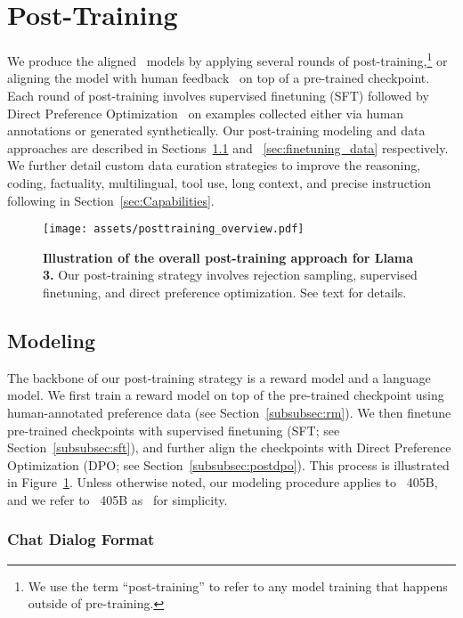 \section{Post-Training}
\label{section:finetuning}
We produce the aligned \llamathree~models by applying several rounds of post-training,\footnote{We use the term ``post-training'' to refer to any model training that happens outside of pre-training.} or aligning the model with human feedback~\citep{ouyang2022instructgpt,rafailov2024direct} on top of a pre-trained checkpoint. Each round of post-training involves supervised finetuning (SFT) followed by Direct Preference Optimization~\citep[DPO;][]{rafailov2024direct} on examples collected either via human annotations or generated synthetically. Our post-training modeling and data approaches are described in Sections~\ref{sec:finetuning_modeling} and ~\ref{sec:finetuning_data} respectively.
We further detail custom data curation strategies to improve the reasoning, coding, factuality, multilingual, tool use, long context, and precise instruction following in Section~\ref{sec:Capabilities}.

\begin{figure}[t]
    \centering
    \texttt{[image: assets/posttraining\_overview.pdf]}
    \caption{\textbf{Illustration of the overall post-training approach for Llama 3.} Our post-training strategy involves rejection sampling, supervised finetuning, and direct preference optimization. See text for details.}
    \label{fig:posttraining_overview}
\end{figure}

\subsection{Modeling}
\label{sec:finetuning_modeling}
The backbone of our post-training strategy is a reward model and a language model. We first train a reward model on top of the pre-trained checkpoint using human-annotated preference data (see Section~\ref{subsubsec:rm}). We then finetune pre-trained checkpoints with supervised finetuning (SFT; see Section~\ref{subsubsec:sft}), and further align the checkpoints with Direct Preference Optimization (DPO; see Section~\ref{subsubsec:postdpo}).
This process is illustrated in Figure~\ref{fig:posttraining_overview}.
Unless otherwise noted, our modeling procedure applies to \llamathree~405B, and we refer to \llamathree~405B as \llamathree~for simplicity. 

\subsubsection{Chat Dialog Format}
\label{subsubsec:chat_format_content}

